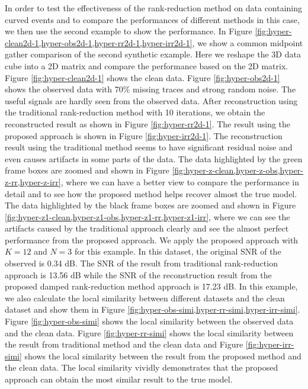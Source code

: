 In order to test the effectiveness of the rank-reduction method on data containing curved events and to compare the performances of different methods in this case, we then use the second example to show the performance. In Figure \ref{fig:hyper-clean2d-1,hyper-obs2d-1,hyper-rr2d-1,hyper-irr2d-1}, we show a common midpoint gather comparison of the second synthetic example. Here we reshape the 3D data cube into a 2D matrix and compare the performance based on the 2D matrix. Figure \ref{fig:hyper-clean2d-1} shows the clean data. Figure \ref{fig:hyper-obs2d-1} shows the observed data with 70\% missing traces and strong random noise. The useful signals are hardly seen from the observed data. After reconstruction using the traditional rank-reduction method with 10  iterations, we obtain the reconstructed result as shown in Figure \ref{fig:hyper-rr2d-1}. The result using the proposed approach is shown in Figure \ref{fig:hyper-irr2d-1}. The reconstruction result using the traditional method seems to have significant residual noise and even causes  artifacts in some parts of the data. The data highlighted by the green frame boxes are zoomed and shown in Figure \ref{fig:hyper-z-clean,hyper-z-obs,hyper-z-rr,hyper-z-irr}, where we can have a better view to compare the performance in detail and to see how the proposed method helps recover almost the true model.  The data highlighted by the black frame boxes are zoomed and shown in Figure \ref{fig:hyper-z1-clean,hyper-z1-obs,hyper-z1-rr,hyper-z1-irr}, where we can see the artifacts caused by the traditional approach clearly and see the almost perfect performance from the proposed approach.  We apply the proposed approach with $K=12$ and $N=3$ for this example. In this dataset, the original SNR of the observed is 0.34 dB. The SNR of the result from traditional rank-reduction approach is 13.56 dB while the SNR of the reconstruction result from the proposed damped rank-reduction method approach is 17.23 dB. In this example, we also calculate the local similarity between different datasets and the clean dataset and show them in Figure \ref{fig:hyper-obs-simi,hyper-rr-simi,hyper-irr-simi}. Figure \ref{fig:hyper-obs-simi} shows the local similarity between the observed data and the clean data. Figure \ref{fig:hyper-rr-simi} shows the local similarity between the result from traditional method and the clean data and Figure \ref{fig:hyper-irr-simi} shows the local similarity between the result from the proposed method and the clean data. The local similarity vividly demonstrates that the proposed approach can obtain the most similar result to the true model. 


